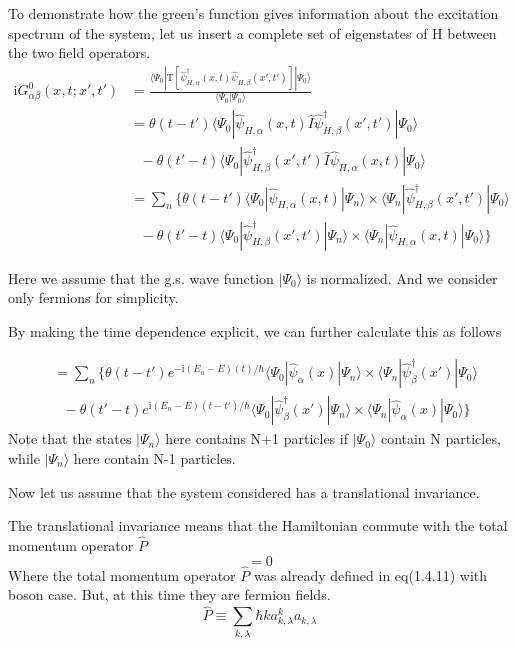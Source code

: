 ﻿\documentclass[twoside]{book}
\numberwithin{equation}{section}
\begin{document}
To demonstrate how the green's function gives information about the excitation spectrum of the system, let us insert a complete set of eigenstates of H between the two field operators.
\begin{align}\label{2.3.7}
\mathrm{i}G^0_{\alpha\beta}(x,t;x',t')&=\frac{\langle\Psi_0|\mathrm{T}[\hat \psi^{
\dagger}_{H,\alpha}(x,t)\hat \psi_{H,\beta} (x',t')]|\Psi_0\rangle}{\langle\Psi_0|\Psi_0\rangle} \nonumber \\
&=\theta(t-t')\langle\Psi_0|\hat \psi_{H,\alpha}(x,t)\hat{I}\hat \psi^{
\dagger}_{H,\beta} (x',t')|\Psi_0\rangle \nonumber \\
& \ \ \ -\theta(t'-t)\langle\Psi_0|\hat \psi^{
\dagger}_{H,\beta}(x',t')\hat{I}\hat \psi_{H,\alpha} (x,t)|\Psi_0\rangle \nonumber \\
&=\sum_n\{\theta(t-t')\langle\Psi_0|\hat \psi_{H,\alpha}(x,t)|\Psi_n\rangle\times\langle\Psi_n|\hat \psi^{
\dagger}_{H,\beta} (x',t')|\Psi_0\rangle \nonumber \\
& \ \ \ -\theta(t'-t)\langle\Psi_0|\hat \psi^{
\dagger}_{H,\beta}(x',t')|\Psi_n\rangle\times\langle\Psi_n|\hat \psi_{H,\alpha} (x,t)|\Psi_0\rangle\}
\end{align}

Here we assume that the g.s. wave function $|\Psi_0\rangle$ is normalized. And we consider only fermions for simplicity.

By making the time dependence explicit, we can further calculate this as follows

\begin{align}
&=\sum_n\{\theta(t-t')e^{-\mathrm{i}(E_n-E)(t)/\hbar}\langle\Psi_0|\hat \psi_{\alpha}(x)|\Psi_n\rangle\times\langle\Psi_n|\hat \psi^{
\dagger}_{\beta} (x')|\Psi_0\rangle \nonumber \\
& \ \ \ -\theta(t'-t)e^{\mathrm{i}(E_n-E)(t-t')/\hbar}\langle\Psi_0|\hat \psi^{
\dagger}_{\beta}(x')|\Psi_n\rangle\times\langle\Psi_n|\hat \psi_{\alpha} (x)|\Psi_0\rangle\} \nonumber
\end{align}
Note that the states $|\Psi_n\rangle$ here contains N+1 particles if $|\Psi_0\rangle$ contain N particles, while $|\Psi_n\rangle$ here contain N-1 particles.

Now let us assume that the system considered has a translational invariance.

The translational invariance means that the Hamiltonian commute with the total momentum operator $\hat{P}$
\begin{equation}
[\hat{H},\hat{P}]=0\label{2.3.8}
\end{equation}
Where the total momentum operator $\hat{P}$ was already defined in eq(1.4.11) with boson case. But, at this time they are fermion fields.
\begin{equation}
\hat{P}\equiv \sum_{k,\lambda} \hbar k a^k_{k,\lambda} a_{k,\lambda} \nonumber
\end{equation}
\end{document}
